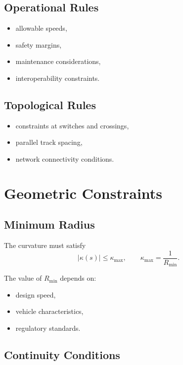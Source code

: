 \subsection{Operational Rules}

\begin{itemize}
\item allowable speeds,
\item safety margins,
\item maintenance considerations,
\item interoperability constraints.
\end{itemize}

\subsection{Topological Rules}

\begin{itemize}
\item constraints at switches and crossings,
\item parallel track spacing,
\item network connectivity conditions.
\end{itemize}


\section{Geometric Constraints}

\subsection{Minimum Radius}

\begin{definition}
The curvature must satisfy
\[
|\kappa(s)| \leq \kappa_{\max},
\qquad
\kappa_{\max} = \frac{1}{R_{\min}}.
\]
\end{definition}

The value of \(R_{\min}\) depends on:
\begin{itemize}
\item design speed,
\item vehicle characteristics,
\item regulatory standards.
\end{itemize}


\subsection{Continuity Conditions}

